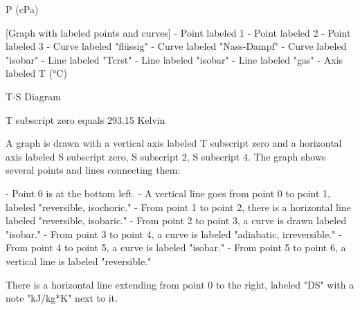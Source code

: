P (cPa)

[Graph with labeled points and curves]
- Point labeled 1
- Point labeled 2
- Point labeled 3
- Curve labeled "flüssig"
- Curve labeled "Nass-Dampf"
- Curve labeled "isobar"
- Line labeled "Tcrst"
- Line labeled "isobar"
- Line labeled "gas"
- Axis labeled T (°C)

T-S Diagram

T subscript zero equals 293.15 Kelvin

A graph is drawn with a vertical axis labeled T subscript zero and a horizontal axis labeled S subscript zero, S subscript 2, S subscript 4. The graph shows several points and lines connecting them:

- Point 0 is at the bottom left.
- A vertical line goes from point 0 to point 1, labeled "reversible, isochoric."
- From point 1 to point 2, there is a horizontal line labeled "reversible, isobaric."
- From point 2 to point 3, a curve is drawn labeled "isobar."
- From point 3 to point 4, a curve is labeled "adiabatic, irreversible."
- From point 4 to point 5, a curve is labeled "isobar."
- From point 5 to point 6, a vertical line is labeled "reversible."

There is a horizontal line extending from point 0 to the right, labeled "DS" with a note "kJ/kg*K" next to it.